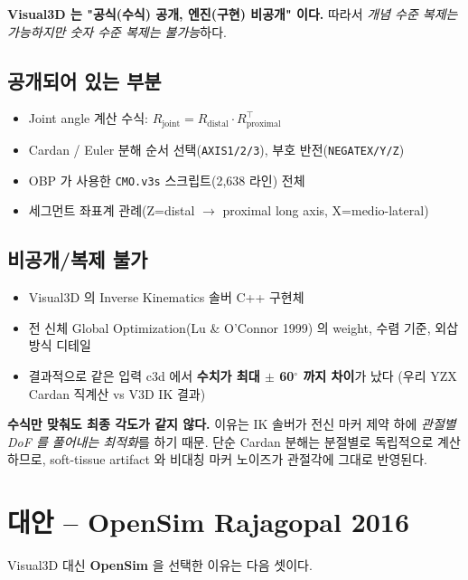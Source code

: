 \documentclass[11pt, a4paper]{report}
\begin{document}
\begin{keyidea}
\textbf{Visual3D 는 "공식(수식) 공개, 엔진(구현) 비공개" 이다.}
따라서 \emph{개념 수준 복제는 가능하지만 숫자 수준 복제는 불가능}하다.
\end{keyidea}

\subsection*{공개되어 있는 부분}
\begin{itemize}
  \item Joint angle 계산 수식: $R_{\text{joint}} = R_{\text{distal}} \cdot R_{\text{proximal}}^\top$
  \item Cardan / Euler 분해 순서 선택(\texttt{AXIS1/2/3}), 부호 반전(\texttt{NEGATEX/Y/Z})
  \item OBP 가 사용한 \texttt{CMO.v3s} 스크립트(2,638 라인) 전체
  \item 세그먼트 좌표계 관례(Z=distal $\to$ proximal long axis, X=medio-lateral)
\end{itemize}

\subsection*{비공개/복제 불가}
\begin{itemize}
  \item Visual3D 의 Inverse Kinematics 솔버 C++ 구현체
  \item 전 신체 Global Optimization(Lu \& O'Connor 1999) 의 weight,
    수렴 기준, 외삽 방식 디테일
  \item 결과적으로 같은 입력 c3d 에서 \textbf{수치가 최대 $\pm$ 60$^\circ$
    까지 차이}가 났다 (우리 YZX Cardan 직계산 vs V3D IK 결과)
\end{itemize}

\begin{warningbox}
\textbf{수식만 맞춰도 최종 각도가 같지 않다.} 이유는 IK 솔버가
전신 마커 제약 하에 \emph{관절별 DoF 를 풀어내는 최적화}를 하기 때문.
단순 Cardan 분해는 분절별로 독립적으로 계산하므로, soft-tissue artifact 와
비대칭 마커 노이즈가 관절각에 그대로 반영된다.
\end{warningbox}

\section{대안 -- OpenSim Rajagopal 2016}

Visual3D 대신 \textbf{OpenSim} 을 선택한 이유는 다음 셋이다.
\end{document}

